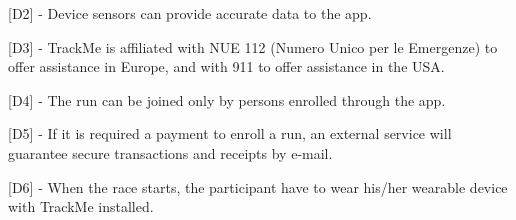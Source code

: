 \hspace{-\parindent}[D2] - Device sensors can provide accurate data to the app. \newline

\hspace{-\parindent}[D3] - TrackMe is affiliated with NUE 112 (Numero Unico per le Emergenze) to offer assistance in Europe, and with 911 to offer assistance in the USA. \newline

\hspace{-\parindent}[D4] - The run can be joined only by persons enrolled through the app. \newline

\hspace{-\parindent}[D5] - If it is required a payment to enroll a run, an external service will guarantee secure transactions and receipts by e-mail. \newline

\hspace{-\parindent}[D6] - When the race starts, the participant have to wear his/her wearable device with TrackMe installed. \newline

%